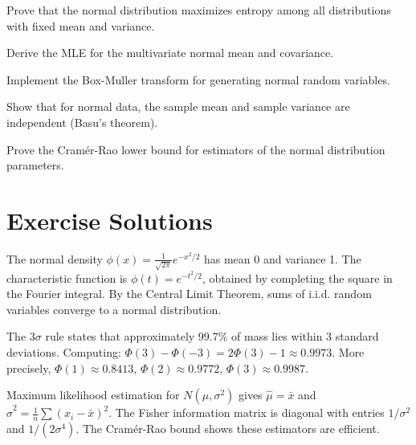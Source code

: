 \begin{exercise}
Prove that the normal distribution maximizes entropy among all distributions with fixed mean and variance.
\end{exercise}

\begin{exercise}
Derive the MLE for the multivariate normal  mean and covariance.
\end{exercise}

\begin{exercise}
Implement the Box-Muller transform for generating normal random variables.
\end{exercise}

\begin{exercise}
Show that for normal data, the sample mean and sample variance are independent (Basu's theorem).
\end{exercise}

\begin{exercise}
Prove the Cramér-Rao lower bound for estimators of the normal distribution parameters.
\end{exercise}



\section{Exercise Solutions}

\begin{solution}
The normal density $\phi(x) = \frac{1}{\sqrt{2\pi}}e^{-x^2/2}$ has mean 0 and variance 1. The characteristic function is $\phi(t) = e^{-t^2/2}$, obtained by completing the square in the Fourier integral. By the Central Limit Theorem, sums of i.i.d. random variables converge to a normal distribution.
\end{solution}

\begin{solution}
The $3\sigma$ rule states that approximately 99.7\% of mass lies within 3 standard deviations. Computing: $\Phi(3) - \Phi(-3) = 2\Phi(3) - 1 \approx 0.9973$. More precisely, $\Phi(1) \approx 0.8413$, $\Phi(2) \approx 0.9772$, $\Phi(3) \approx 0.9987$.
\end{solution}

\begin{solution}
Maximum likelihood estimation for $N(\mu, \sigma^2)$ gives $\hat{\mu} = \bar{x}$ and $\hat{\sigma}^2 = \frac{1}{n}\sum(x_i - \bar{x})^2$. The Fisher information matrix is diagonal with entries $1/\sigma^2$ and $1/(2\sigma^4)$. The Cramér-Rao bound shows these estimators are efficient.
\end{solution}

